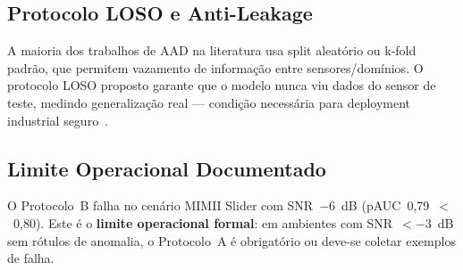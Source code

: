 \subsection{Protocolo LOSO e Anti-Leakage}

A maioria dos trabalhos de AAD na literatura usa split aleatório ou k-fold padrão, que permitem
vazamento de informação entre sensores/domínios. O protocolo LOSO proposto garante que o modelo nunca
viu dados do sensor de teste, medindo generalização real --- condição necessária para deployment
industrial seguro~\cite{Nishida2025}.

\subsection{Limite Operacional Documentado}

O Protocolo~B falha no cenário MIMII Slider com SNR~$-6$~dB (pAUC~0,79~$<$~0,80). Este é o
\textbf{limite operacional formal}: em ambientes com SNR~$<-3$~dB sem rótulos de anomalia,
o Protocolo~A é obrigatório ou deve-se coletar exemplos de falha.

\color{black}
